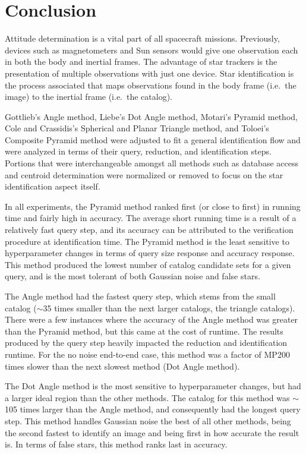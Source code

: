 \section{Conclusion}\label{sec:conclusion}
Attitude determination is a vital part of all spacecraft missions.
Previously, devices such as magnetometers and Sun sensors would give one observation each in both the body and inertial
frames.
The advantage of star trackers is the presentation of multiple observations with just one device.
Star identification is the process associated that maps observations found in the body frame (i.e.\ the image) to the
inertial frame (i.e.\ the catalog).

Gottlieb's Angle method, Liebe's Dot Angle method, Motari's Pyramid method, Cole and Crassidis's Spherical and
Planar Triangle method, and Toloei's Composite Pyramid method were adjusted to fit a general identification flow
and were analyzed in terms of their query, reduction, and identification steps.
Portions that were interchangeable amongst all methods such as database access and centroid determination were
normalized or removed to focus on the star identification aspect itself.

In all experiments, the Pyramid method ranked first (or close to first) in running time and fairly high in accuracy.
The average short running time is a result of a relatively fast query step, and its accuracy can be attributed to the
verification procedure at identification time.
The Pyramid method is the least sensitive to hyperparameter changes in terms of query size response and accuracy
response.
This method produced the lowest number of catalog candidate sets for a given query, and is the most tolerant of
both Gaussian noise and false stars.

The Angle method had the fastest query step, which stems from the small catalog ($\sim$35 times smaller than
the next larger catalogs, the triangle catalogs).
There were a few instances where the accuracy of the Angle method was greater than the Pyramid method, but this came
at the cost of runtime.
The results produced by the query step heavily impacted the reduction and identification runtime.
For the no noise end-to-end case, this method was a factor of MP200 times slower than the next slowest method (Dot
Angle method).

The Dot Angle method is the most sensitive to hyperparameter changes, but had a larger ideal region than the other
methods.
The catalog for this method was $\sim$105 times larger than the Angle method, and consequently had the longest query
step.
This method handles Gaussian noise the best of all other methods, being the second fastest to identify an image and
being first in how accurate the result is.
In terms of false stars, this method ranks last in accuracy.

